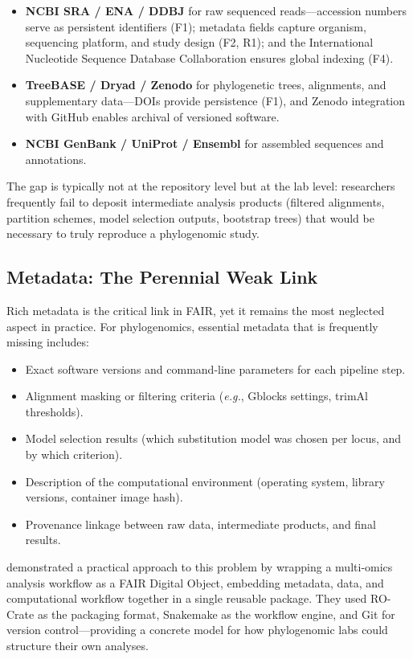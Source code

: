 \begin{itemize}
\item \textbf{NCBI SRA / ENA / DDBJ} for raw sequenced reads---accession numbers serve as persistent identifiers (F1); metadata fields capture organism, sequencing platform, and study design (F2, R1); and the International Nucleotide Sequence Database Collaboration ensures global indexing (F4).

\item \textbf{TreeBASE / Dryad / Zenodo} for phylogenetic trees, alignments, and supplementary data---DOIs provide persistence (F1), and Zenodo integration with GitHub enables archival of versioned software.

\item \textbf{NCBI GenBank / UniProt / Ensembl} for assembled sequences and annotations.
\end{itemize}

The gap is typically not at the repository level but at the lab level: researchers frequently fail to deposit intermediate analysis products (filtered alignments, partition schemes, model selection outputs, bootstrap trees) that would be necessary to truly reproduce a phylogenomic study.

\subsection{Metadata: The Perennial Weak Link}

Rich metadata is the critical link in FAIR, yet it remains the most neglected aspect in practice. For phylogenomics, essential metadata that is frequently missing includes:

\begin{itemize}
\item Exact software versions and command-line parameters for each pipeline step.
\item Alignment masking or filtering criteria (\textit{e.g.}, Gblocks settings, trimAl thresholds).
\item Model selection results (which substitution model was chosen per locus, and by which criterion).
\item Description of the computational environment (operating system, library versions, container image hash).
\item Provenance linkage between raw data, intermediate products, and final results.
\end{itemize}

\textcite{niehues2024} demonstrated a practical approach to this problem by wrapping a multi-omics analysis workflow as a FAIR Digital Object, embedding metadata, data, and computational workflow together in a single reusable package. They used RO-Crate as the packaging format, Snakemake as the workflow engine, and Git for version control---providing a concrete model for how phylogenomic labs could structure their own analyses.


